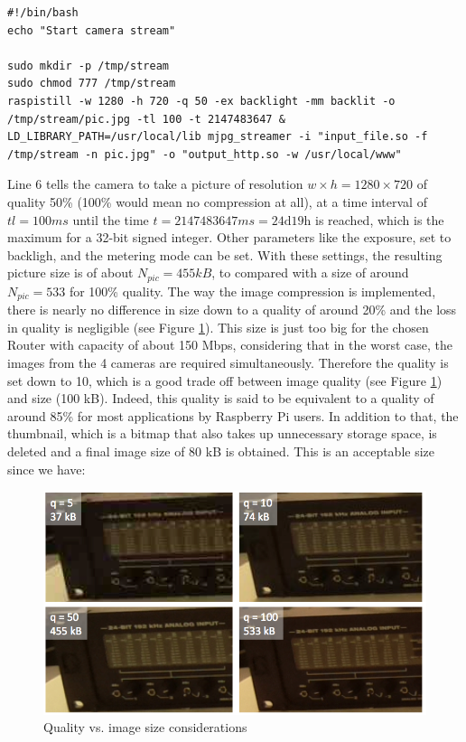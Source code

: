 \begin{center}
\begin{minipage}{0.9\linewidth}
\begin{lstlisting}[caption=$\sim\hspace{-0.5em}/start\_camera.sh$, label=startcamera, frame=none]
#!/bin/bash
echo "Start camera stream"

sudo mkdir -p /tmp/stream
sudo chmod 777 /tmp/stream
raspistill -w 1280 -h 720 -q 50 -ex backlight -mm backlit -o /tmp/stream/pic.jpg -tl 100 -t 2147483647 &
LD_LIBRARY_PATH=/usr/local/lib mjpg_streamer -i "input_file.so -f /tmp/stream -n pic.jpg" -o "output_http.so -w /usr/local/www"
\end{lstlisting}
\end{minipage}
\end{center}

Line 6 tells the camera to take a picture of resolution $w \times h = 1280 \times 720$ of quality 50\% (100\% would mean no compression at all), at a time interval of $tl = 100ms$ until the time $t = 2147483647ms = 24 \text{d} 19 \text{h}$ is reached, which is the maximum for a 32-bit signed integer.
Other parameters like the exposure, set to backligh, and the metering mode can be set. 
With these settings, the resulting picture size is of about $N_{pic}=455kB$, to compared with a size of around $N_{pic}=533$ for 100\% quality. The way the image compression is implemented, there is nearly no difference in size down to a quality of around 20\% and the loss in quality is negligible (see Figure \ref{fig:quality}).
This size is just too big for the chosen Router with capacity of about 150 Mbps, considering that in the worst case, the images from the 4 cameras are required simultaneously. Therefore the quality is set down to 10, which is a good trade off between image quality (see Figure \ref{fig:quality}) and size (100 kB). Indeed, this quality is said to be equivalent to a quality of around 85\% for most applications by Raspberry Pi users. %
In addition to that, the thumbnail, which is a bitmap that also takes up unnecessary storage space, is deleted and a final image size of 80 kB is obtained. This is an acceptable size since we have:

\begin{figure}[htb]
    \centering
    \includegraphics[width=\linewidth]{files/quality.png}
    \caption{Quality vs. image size considerations}
    \label{fig:quality}
\end{figure}

